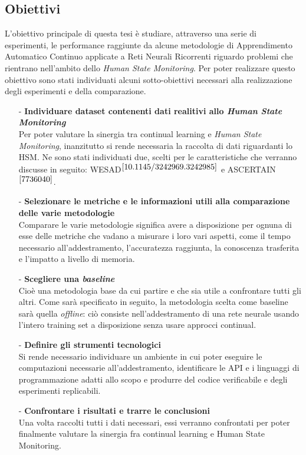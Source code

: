 \subsection*{Obiettivi}
L'obiettivo principale di questa tesi è studiare, attraverso una serie di esperimenti, le performance raggiunte da alcune metodologie di Apprendimento Automatico Continuo applicate a Reti Neurali Ricorrenti riguardo problemi che rientrano nell'ambito dello \textit{Human State Monitoring}. Per poter realizzare questo obiettivo sono stati individuati alcuni sotto-obiettivi necessari alla realizzazione degli esperimenti e della comparazione.
\begin{itemize}
    \item[-] \textbf{Individuare dataset contenenti dati realitivi allo \textit{Human State Monitoring}}\\
    Per poter valutare la sinergia tra continual learning e \textit{Human State Monitoring}, inanzitutto si rende necessaria la raccolta di dati riguardanti lo HSM. Ne sono stati individuati due, scelti per le caratteristiche che verranno discusse in seguito: WESAD$^{\cite{10.1145/3242969.3242985}}$ e ASCERTAIN$^{\cite{7736040}}$.
    \item[-] \textbf{Selezionare le metriche e le informazioni utili alla comparazione delle varie metodologie}\\
    Comparare le varie metodologie significa avere a disposizione per ognuna di esse delle metriche che vadano a misurare i loro vari aspetti, come il tempo necessario all'addestramento, l'accuratezza raggiunta, la conoscenza trasferita e l'impatto a livello di memoria.
    \item[-] \textbf{Scegliere una \textit{baseline}}\\
    Cioè una metodologia base da cui partire e che sia utile a confrontare tutti gli altri. Come sarà specificato in seguito, la metodologia scelta come baseline sarà quella \textit{offline}: ciò consiste nell'addestramento di una rete neurale usando l'intero training set a disposizione senza usare approcci continual.
    \item[-] \textbf{Definire gli strumenti tecnologici}\\
    Si rende necessario individuare un ambiente in cui poter eseguire le computazioni necessarie all'addestramento, identificare le API e i linguaggi di programmazione adatti allo scopo e produrre del codice verificabile e degli esperimenti replicabili.
    \item[-] \textbf{Confrontare i risultati e trarre le conclusioni}\\
    Una volta raccolti tutti i dati necessari, essi verranno confrontati per poter finalmente valutare la sinergia fra continual learning e Human State Monitoring.
\end{itemize}
\pagebreak

